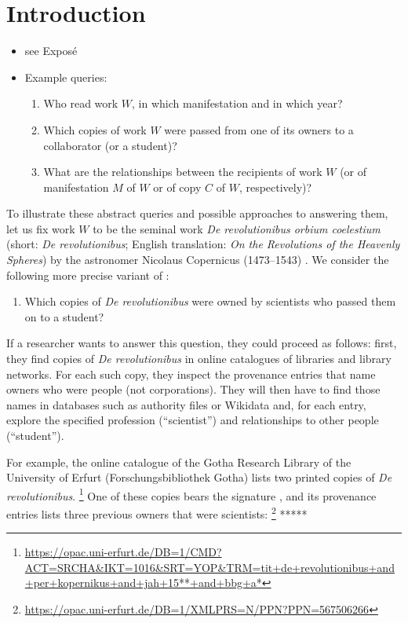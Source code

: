 
\chapter{Introduction}
\label{chap:intro}

\begin{itemize}
  \item
    see Exposé
  \item
    Example queries:
    \begin{enumerate}
      \item[\exaquery{1}]
        Who read work $W$, in which manifestation and in which year?
      \item[\exaquery{2}]
        Which copies of work $W$ were passed from one of its owners to a collaborator (or a student)?
      \item[\exaquery{3}]
        What are the relationships between the recipients of work $W$
        (or of manifestation $M$ of $W$ or of copy $C$ of $W$, respectively)?
    \end{enumerate}
\end{itemize}
%
To illustrate these abstract queries and possible approaches to answering them, let us fix work $W$ to be the seminal work \emph{De revolutionibus orbium coelestium}
(short: \emph{De revolutionibus}; English translation: \emph{On the Revolutions of the Heavenly Spheres}) by the astronomer Nicolaus Copernicus (1473–1543) .
We consider the following more precise variant of :
%
\begin{enumerate}
  \item[\exaquery{2$'$}]
    Which copies of \emph{De revolutionibus} were owned by scientists who passed them on to a student?
\end{enumerate}
%
If a researcher wants to answer this question, they could proceed as follows: first, they find copies of \emph{De revolutionibus} 
in online catalogues of libraries and library networks. For each such copy, they inspect the provenance entries
that name owners who were people (not corporations). They will then have to find those names in databases such as
authority files or Wikidata and, for each entry, explore the specified profession (``scientist'') and relationships to other people (``student'').

For example, the online catalogue of the Gotha Research Library of the University of Erfurt (Forschungsbibliothek Gotha) lists two printed copies
of \emph{De revolutionibus}.%
\footnote{%
  \url{https://opac.uni-erfurt.de/DB=1/CMD?ACT=SRCHA&IKT=1016&SRT=YOP&TRM=tit+de+revolutionibus+and+per+kopernikus+and+jah+15**+and+bbg+a*}%
}
One of these copies bears the signature , and its provenance entries lists three previous owners that were scientists:%
\footnote{%
  \url{https://opac.uni-erfurt.de/DB=1/XMLPRS=N/PPN?PPN=567506266}%
}
%
*****

